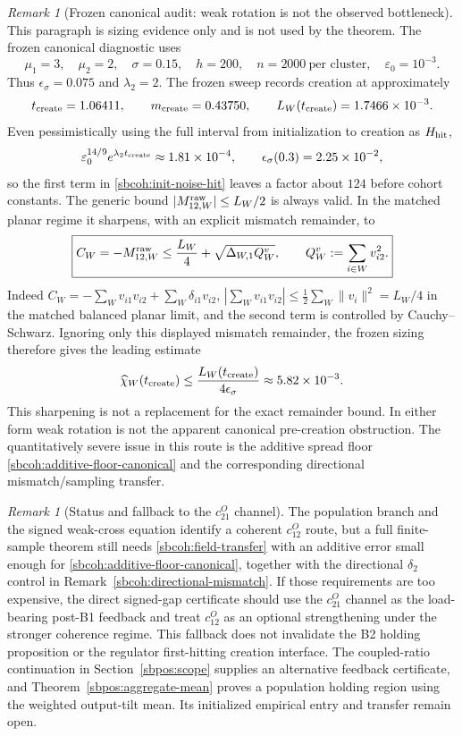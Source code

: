 \documentclass{article} %
\theoremstyle{plain}
\theoremstyle{definition}
\theoremstyle{remark}
\newtheorem{remark}[theorem]{Remark}
\begin{document}
\begin{remark}[Frozen canonical audit: weak rotation is not the observed bottleneck]
\label{sbcoh:canonical-audit}
This paragraph is sizing evidence only and is not used by the theorem.  The
frozen canonical diagnostic uses
\[
 \mu_1=3,\quad \mu_2=2,\quad \sigma=0.15,
 \quad h=200,\quad n=2000\ \text{per cluster},
 \quad \varepsilon_0=10^{-3}.
\]
Thus $\epsilon_\sigma=0.075$ and $\lambda_2=2$.  The frozen sweep records
creation at approximately
\[
 t_{\rm create}=1.06411,
 \qquad
 m_{\rm create}=0.43750,
 \qquad
 L_W(t_{\rm create})=1.7466\times10^{-3}.
\]
Even pessimistically using the full interval from initialization to creation
as $H_{\rm hit}$,
\[
 \varepsilon_0^{14/9}e^{\lambda_2t_{\rm create}}
 \approx1.81\times10^{-4},
 \qquad
 \epsilon_\sigma(0.3)=2.25\times10^{-2},
\]
so the first term in \eqref{sbcoh:init-noise-hit} leaves a factor about
$124$ before cohort constants.  The generic bound
$|M_{12,W}^{\rm raw}|\le L_W/2$ is always valid.  In the matched planar
regime it sharpens, with an explicit mismatch remainder, to
\[
 \boxed{
 C_W=-M_{12,W}^{\rm raw}
 \le \frac{L_W}{4}
 +\sqrt{\Delta_{W,1}Q_W^v},
 \qquad Q_W^v:=\sum_{i\in W}v_{i2}^2.
 }
\]
Indeed
$C_W=-\sum_Wv_{i1}v_{i2}+\sum_W\delta_{i1}v_{i2}$,
$|\sum_Wv_{i1}v_{i2}|\le\frac12\sum_W\|v_i\|^2=L_W/4$
in the matched balanced planar limit, and the second term is controlled by
Cauchy--Schwarz.  Ignoring only this displayed mismatch remainder, the frozen
sizing therefore gives the leading estimate
\[
 \widehat\chi_W(t_{\rm create})
 \le\frac{L_W(t_{\rm create})}{4\epsilon_\sigma}
 \approx5.82\times10^{-3}.
\]
This sharpening is not a replacement for the exact remainder bound.  In
either form weak rotation is not the apparent canonical pre-creation
obstruction.  The quantitatively severe issue in this route is
the additive spread floor \eqref{sbcoh:additive-floor-canonical} and the
corresponding directional mismatch/sampling transfer.
\end{remark}

\begin{remark}[Status and fallback to the $c_{21}^O$ channel]
\label{sbcoh:status}
The population branch and the signed weak-cross equation identify a coherent
$c_{12}^O$ route, but a full finite-sample theorem still needs
\eqref{sbcoh:field-transfer} with an additive error small enough for
\eqref{sbcoh:additive-floor-canonical}, together with the directional
$\delta_2$ control in Remark~\ref{sbcoh:directional-mismatch}.  If those
requirements are too expensive, the direct signed-gap certificate should use
the $c_{21}^O$ channel as the load-bearing post-B1 feedback and treat
$c_{12}^O$ as an optional strengthening under the stronger coherence regime.
This fallback does not invalidate the B2 holding proposition or the regulator
first-hitting creation interface. The coupled-ratio continuation in
Section~\ref{sbpos:scope} supplies an alternative feedback certificate,
and Theorem~\ref{sbpos:aggregate-mean} proves a population holding
region using the weighted output-tilt mean. Its initialized empirical
entry and transfer remain open.
\end{remark}
\end{document}

